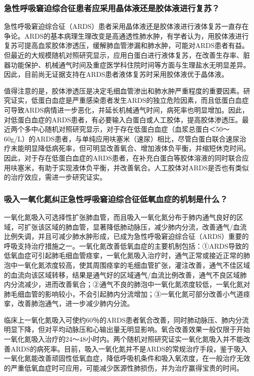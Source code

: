 \subsubsection{急性呼吸窘迫综合征患者应采用晶体液还是胶体液进行复苏？}

急性呼吸窘迫综合征（ARDS）患者采用晶体液还是胶体液进行液体复苏一直存在争论。ARDS的基本病理生理改变是高通透性肺水肿，有学者认为，用胶体液进行复苏可提高血浆胶体渗透压，缓解肺血管渗漏和肺水肿，可能对ARDS患者有益。但最近的大规模随机对照研究显示，应用白蛋白进行液体复苏，在改善生存率、脏器功能保护、机械通气时间及重症医学科住院时间等方面与生理盐水无明显差异。因此，目前尚无证据支持在ARDS患者液体复苏时采用胶体液优于晶体液。

值得注意的是，胶体渗透压是决定毛细血管渗出和肺水肿严重程度的重要因素。研究证实，低蛋白血症是严重感染患者发生ARDS的独立危险因素，而且低蛋白血症可导致ARDS病情进一步恶化，并延长机械通气时间，病死率也明显增加。因此，对低蛋白血症的ARDS患者，有必要输入白蛋白或人工胶体，提高胶体渗透压。最近两个多中心随机对照研究显示，对于存在低蛋白血症（血浆总蛋白＜50～60g/L）的ARDS患者，与单纯应用呋塞米（速尿）相比，尽管白蛋白联合速尿治疗未能明显降低病死率，但可明显改善氧合、增加液体负平衡，并缩短休克时间。因此，对于存在低蛋白血症的ARDS患者，在补充白蛋白等胶体溶液的同时联合应用呋塞米，有助于实现液体负平衡，并改善氧合。人工胶体对ARDS是否也有类似的治疗效应，需进一步研究证实。

\subsubsection{吸入一氧化氮纠正急性呼吸窘迫综合征低氧血症的机制是什么？}

一氧化氮吸入可选择性扩张肺血管，而且吸入一氧化氮分布于肺内通气良好的区域，可扩张该区域的肺血管，显著降低肺动脉压，减少肺内分流，改善通气/血流比例失调，并且可减少肺水肿形成，已成为急性呼吸窘迫综合征（ARDS）重要的呼吸支持治疗措施之一。一氧化氮改善低氧血症的主要机制包括：①ARDS导致的低氧血症可引起肺毛细血管痉挛，一氧化氮吸入治疗时，通气正常或接近正常的肺泡中一氧化氮浓度较高，使其周围痉挛的毛细血管扩张，灌注改善，通气不佳区域的血流向该区域转移，结果是通气好的区域通气/血流比例改善，通气不良区域肺内分流减少，进而改善氧合；②通气不良的肺泡中一氧化氮浓度较低，一氧化氮对肺毛细血管的影响较小，不会引起肺内分流增加；③一氧化氮可部分改善小气道痉挛，改善肺泡通气，进一步减少肺内分流。

临床上一氧化氮吸入可使约60％的ARDS患者氧合改善，同时肺动脉压、肺内分流明显下降，但对平均动脉压和心输出量无明显影响。氧合改善效果一般仅限于开始一氧化氮吸入治疗的24～48小时内。两个随机对照研究证实一氧化氮吸入并不能改善ARDS的病死率。目前，吸入一氧化氮并不是ARDS的常规治疗手段，鉴于吸入一氧化氮能改善顽固性低氧血症，降低呼吸机条件和吸入氧浓度，在一般治疗无效的严重低氧血症时可应用，可能减少医源性肺损伤，并为治疗赢得宝贵的时间。

